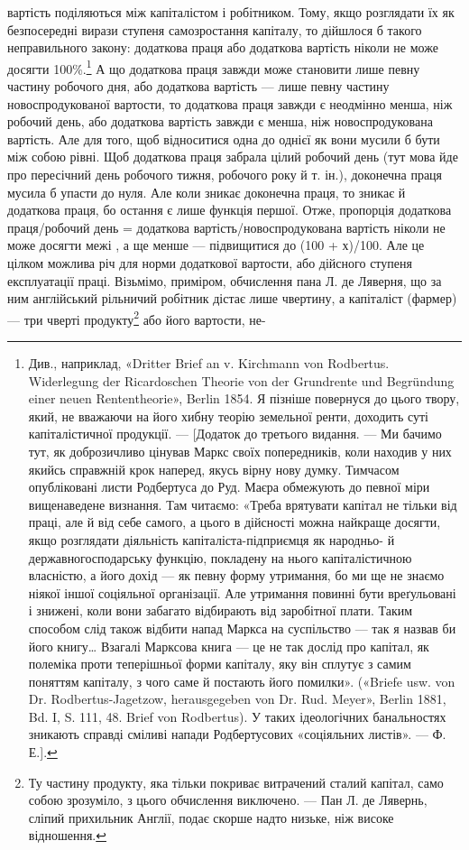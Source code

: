 \parcont{}  %
вартість поділяються між капіталістом і робітником. Тому, якщо
розглядати їх як безпосередні вирази ступеня самозростання
капіталу, то дійшлося б такого неправильного закону: додаткова
праця або додаткова вартість ніколи не може досягти 100\%.\footnote{
Див., наприклад, «Dritter Brief an v. Kirchmann von Rodbertus.
Widerlegung der Ricardoschen Theorie von der Grundrente und Begründung
einer neuen Rententheorie», Berlin 1854. Я пізніше повернуся
до цього твору, який, не вважаючи на його хибну теорію земельної ренти,
доходить суті капіталістичної продукції. — [Додаток до третього видання.
— Ми бачимо тут, як доброзичливо цінував Маркс своїх попередників,
коли находив у них якийсь справжній крок наперед, якусь вірну
нову думку. Тимчасом опубліковані листи Родбертуса до Руд. Маєра
обмежують до певної міри вищенаведене визнання. Там читаємо: «Треба
врятувати капітал не тільки від праці, але й від себе самого, а цього в
дійсності можна найкраще досягти, якщо розглядати діяльність капіталіста-підприємця як народньо- й
державногосподарську функцію,
покладену на нього капіталістичною власністю, а його дохід — як певну
форму утримання, бо ми ще не знаємо ніякої іншої соціяльної організації.
Але утримання повинні бути вреґульовані і знижені, коли вони
забагато відбирають від заробітної плати. Таким способом слід також
відбити напад Маркса на суспільство — так я назвав би його книгу\dots{}
Взагалі Марксова книга — це не так дослід про капітал, як полеміка
проти теперішньої форми капіталу, яку він сплутує з самим поняттям
капіталу, з чого саме й постають його помилки». («Briefe usw. von Dr.
Rodbertus-Jagetzow, herausgegeben von Dr. Rud. Meyer», Berlin 1881,
Bd. I, S. 111, 48. Brief von Rodbertus). У таких ідеологічних банальностях
зникають справді сміливі напади Родбертусових «соціяльних листів».
— Ф. Е.].
}
А що додаткова праця завжди може становити лише певну частину
робочого дня, або додаткова вартість — лише певну частину
новоспродукованої вартости, то додаткова праця завжди є неодмінно
менша, ніж робочий день, або додаткова вартість завжди
є менша, ніж новоспродукована вартість. Але для того, щоб
відноситися одна до однієї як  вони мусили б бути між собою
рівні. Щоб додаткова праця забрала цілий робочий день (тут
мова йде про пересічний день робочого тижня, робочого року
й т. ін.), доконечна праця мусила б упасти до нуля. Але коли
зникає доконечна праця, то зникає й додаткова праця, бо остання
є лише функція першої. Отже, пропорція додаткова праця/робочий день =
додаткова вартість/новоспродукована вартість ніколи не може досягти межі
, а ще менше — підвищитися до (100 + х)/100. Але це цілком можлива річ
для норми додаткової вартости, або дійсного ступеня експлуатації
праці. Візьмімо, приміром, обчислення пана Л. де Ляверня,
що за ним англійський рільничий робітник дістає лише чвертину,
а капіталіст (фармер) — три чверті продукту\footnote{
Ту частину продукту, яка тільки покриває витрачений сталий
капітал, само собою зрозуміло, з цього обчислення виключено. — Пан
Л. де Лявернь, сліпий прихильник Англії, подає скорше надто низьке,
ніж високе відношення.
} або його вартости, не-
\parbreak{}  %
